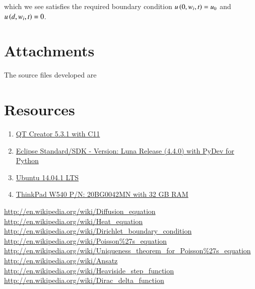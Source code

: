 \documentclass[11pt,english,a4paper]{article}
\begin{document}
\begin{flushleft}
which we see satisfies the required boundary condition $u\left({0,w_i,t}\right) = u_0$ and $u\left({d,w_i,t}\right)=0$.


\section{Attachments}

The source files developed are


\section{Resources}

\begin{enumerate}
\item{\href{http://qt-project.org/downloads}{QT Creator 5.3.1 with C11}}
\item{\href{https://www.eclipse.org/downloads/}{Eclipse Standard/SDK  - Version: Luna Release (4.4.0) with PyDev for Python}}
\item{\href{http://www.ubuntu.com/download/desktop}{Ubuntu 14.04.1 LTS}}
\item{\href{http://shop.lenovo.com/no/en/laptops/thinkpad/w-series/w540/#tab-reseller}{ThinkPad W540 P/N: 20BG0042MN with 32 GB RAM}}
\end{enumerate}

\begin{thebibliography}{1}
\href{http://en.wikipedia.org/wiki/Diffusion\_equation}{http://en.wikipedia.org/wiki/Diffusion\_equation}
\href{http://en.wikipedia.org/wiki/Heat\_equation}{http://en.wikipedia.org/wiki/Heat\_equation}
\href{http://en.wikipedia.org/wiki/Dirichlet\_boundary\_condition}{http://en.wikipedia.org/wiki/Dirichlet\_boundary\_condition}
\href{http://en.wikipedia.org/wiki/Poisson\%27s\_equation}{http://en.wikipedia.org/wiki/Poisson\%27s\_equation}
\href{http://en.wikipedia.org/wiki/Uniqueness\_theorem\_for\_Poisson\%27s\_equation}{http://en.wikipedia.org/wiki/Uniqueness\_theorem\_for\_Poisson\%27s\_equation}
\href{http://en.wikipedia.org/wiki/Ansatz}{http://en.wikipedia.org/wiki/Ansatz}
\href{http://en.wikipedia.org/wiki/Heaviside\_step\_function}{http://en.wikipedia.org/wiki/Heaviside\_step\_function}
\href{http://en.wikipedia.org/wiki/Dirac\_delta\_function}{http://en.wikipedia.org/wiki/Dirac\_delta\_function}
\end{thebibliography}

\end{flushleft}
\end{document}
